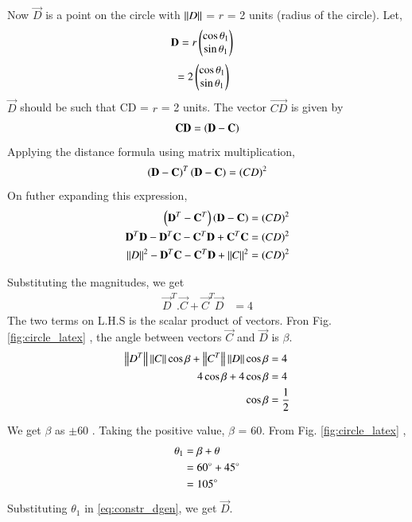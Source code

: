 \begin{enumerate}[label=\thesection.\arabic*.,ref=\thesection.\theenumi]
Now $\vec{D}$ is a point on the circle with $\left\lVert D\right\rVert$ = $r$ = 2 units (radius of the circle).
Let,
\begin{align}
\mathbf{D} & = r\begin{pmatrix}\cos\theta_1\\\sin\theta_1\end{pmatrix} 
\end{align}
\begin{align}
  & = 2\begin{pmatrix}\cos\theta_1\\\sin\theta_1\end{pmatrix}
\label{eq:constr_dgen}
\end{align}
$\vec{D}$ should be such that CD = $r$ = 2 units. The vector $\vec{CD}$ is given by 
\begin{align}
\mathbf{CD} = \left(\mathbf{D} - \mathbf{C}\right)
\end{align}
Applying the distance formula using matrix multiplication,
\begin{align}
\left(\mathbf{D} - \mathbf{C}\right)^T\left(\mathbf{D} - \mathbf{C}\right) &= (CD)^2\\
 \label{eq:dist_formula}
\end{align}
On futher expanding this expression,
\begin{align}
 \left(\mathbf{D}^T - \mathbf{C}^T\right)\left(\mathbf{D} - \mathbf{C}\right) &= (CD)^2 \\
 \mathbf{D}^T\mathbf{D} - \mathbf{D}^T\mathbf{C} - \mathbf{C}^T\mathbf{D} + \mathbf{C}^T\mathbf{C} &= (CD)^2 \\
 \left\lVert D\right\rVert ^2 - \mathbf{D}^T\mathbf{C} - \mathbf{C}^T\mathbf{D} + \left\lVert C\right\rVert^2 &= (CD)^2 
\end{align}

Substituting the magnitudes, we get
\begin{align}
\vec{D}^T.\vec{C} + \vec{C}^T\vec{D} &= 4
\end{align}
The two terms on L.H.S is the scalar product of vectors. Fron Fig. \ref{fig:circle_latex} , the angle between vectors $\vec{C}$ and $\vec{D}$ is $\beta$.
\begin{align}
\left\lVert D^T\right\rVert\left\lVert C\right\rVert\cos\beta + \left\lVert C^T\right\rVert\left\lVert D\right\rVert\cos\beta &= 4 \\
4\cos\beta + 4\cos\beta &= 4 \\
\cos\beta &= \frac{1}{2}
\end{align}

We get $\beta$ as $\pm$60 \degree. Taking the positive value, $\beta$ = 60\degree. From Fig. \ref{fig:circle_latex} , 
\begin{align}
\theta_1 &= \beta + \theta  \\
 &= 60\degree + 45\degree \\
 &= 105\degree
\end{align}
Substituting $\theta_1$ in \eqref{eq:constr_dgen}, we get $\vec{D}$. 




\end{enumerate}
